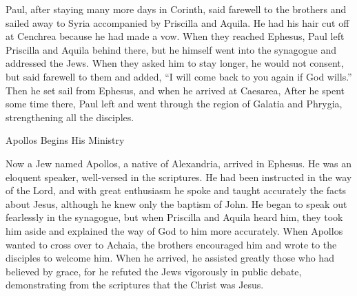 {\par }{\PP {}Paul,
after
staying
many
more
days
in Corinth, said farewell
to the brothers
and sailed away
to
Syria
accompanied by Priscilla
and
Aquila.
He had his hair cut off
at
Cenchrea
because
he had
made a vow.
When they reached
Ephesus,
Paul left
Priscilla and Aquila
behind
there,
but
he himself
went
into
the synagogue
and addressed
the Jews.
When
they
asked
him to stay
longer,
he would
not
consent,
but
said farewell
to them and
added, “I will come back
to
you
again
if God
wills.”
Then he set sail
from
Ephesus,
and
when
he arrived
at
Caesarea,
After
he spent
some
time
there, Paul left
and went through
the region
of Galatia
and
Phrygia,
strengthening
all
the disciples.
\par }{\SH Apollos Begins His Ministry
\par }{\PP {}Now a Jew
named
Apollos,
a native
of Alexandria,
arrived
in
Ephesus.
He was
an eloquent
speaker,
well-versed
in
the scriptures.
He
had been
instructed
in the way
of the Lord,
and
with great enthusiasm
he spoke
and
taught
accurately
the facts about
Jesus,
although he knew
only
the baptism
of John.
He
began
to speak out fearlessly
in
the synagogue,
but
when Priscilla
and
Aquila
heard
him,
they took
him
aside
and
explained
the way
of God
to him
more accurately.
When
Apollos wanted
to cross over
to
Achaia,
the brothers
encouraged
him and wrote
to the disciples
to welcome
him.
When he arrived,
he assisted
greatly
those who had believed
by
grace,
for
he refuted
the Jews
vigorously
in public debate,
demonstrating
from
the scriptures
that the Christ
was
Jesus.

}
